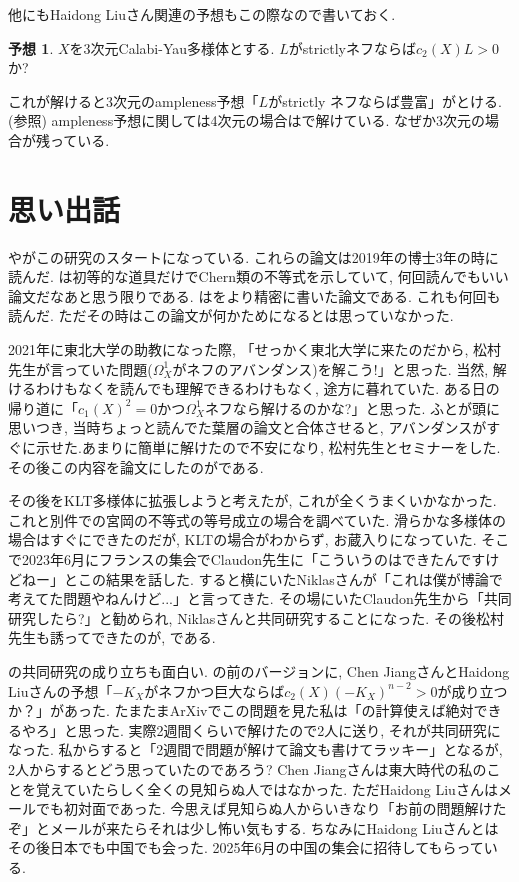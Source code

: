 \documentclass[dvipdfmx]{msjproc}
\theoremstyle{definition}
\newtheorem{conj}[thm]{予想}
\begin{document}
他にもHaidong Liuさん関連の予想もこの際なので書いておく.
 \begin{conj}
 $X$を3次元Calabi-Yau多様体とする. $L$がstrictlyネフならば$c_2(X)L>0$か?
 \end{conj}
 これが解けると3次元のampleness予想「$L$がstrictly ネフならば豊富」がとける.(\cite{Liu23}参照)
ampleness予想に関しては4次元の場合は\cite{LM23}で解けている. 
なぜか3次元の場合が残っている. 

\begin{comment}
\end{comment}

\section{思い出話}
\cite{Miy87}や\cite{Ou17}がこの研究のスタートになっている.
これらの論文は2019年の博士3年の時に読んだ. 
\cite{Miy87}は初等的な道具だけでChern類の不等式を示していて, 何回読んでもいい論文だなあと思う限りである.
\cite{Ou17}は\cite{Miy87}をより精密に書いた論文である. これも何回も読んだ. 
ただその時はこの論文が何かためになるとは思っていなかった. 

2021年に東北大学の助教になった際, 「せっかく東北大学に来たのだから, 松村先生が言っていた問題($\Omega_{X}^{1}$がネフのアバンダンス)を解こう!」と思った.
当然, 解けるわけもなく\cite{WZ02}を読んでも理解できるわけもなく, 途方に暮れていた.
ある日の帰り道に「$c_1(X)^2=0$かつ$\Omega_{X}^{1}$ネフなら解けるのかな?」と思った. 
ふと\cite{Ou17}が頭に思いつき, 当時ちょっと読んでた葉層の論文\cite{PRT22}と合体させると, アバンダンスがすぐに示せた.あまりに簡単に解けたので不安になり, 松村先生とセミナーをした. その後この内容を論文にしたのが\cite{IM22}である.

その後\cite{IM22}をKLT多様体に拡張しようと考えたが, これが全くうまくいかなかった.
これと別件で\cite{Miy87}の宮岡の不等式の等号成立の場合を調べていた. 滑らかな多様体の場合はすぐにできたのだが, KLTの場合がわからず,  お蔵入りになっていた. 
そこで2023年6月にフランスの集会でClaudon先生に「こういうのはできたんですけどねー」とこの結果を話した. すると横にいたNiklasさんが「これは僕が博論で考えてた問題やねんけど...」と言ってきた. その場にいたClaudon先生から「共同研究したら?」と勧められ, Niklasさんと共同研究することになった.
その後松村先生も誘ってできたのが, \cite{IMM24}である.  

\cite{IJL23}の共同研究の成り立ちも面白い. \cite{IJL23}の前のバージョンに, Chen JiangさんとHaidong Liuさんの予想「$-K_X$がネフかつ巨大ならば$c_2(X) (-K_X)^{n-2}>0$が成り立つか？」があった. たまたまArXivでこの問題を見た私は「\cite{IM22}の計算使えば絶対できるやろ」と思った. 実際2週間くらいで解けたので2人に送り, それが共同研究になった. 
私からすると「2週間で問題が解けて論文も書けてラッキー」となるが, 2人からするとどう思っていたのであろう?
Chen Jiangさんは東大時代の私のことを覚えていたらしく全くの見知らぬ人ではなかった.
ただHaidong Liuさんはメールでも初対面であった. 今思えば見知らぬ人からいきなり「お前の問題解けたぞ」とメールが来たらそれは少し怖い気もする. 
ちなみにHaidong Liuさんとはその後日本でも中国でも会った. 2025年6月の中国の集会に招待してもらっている. 



\end{document}
